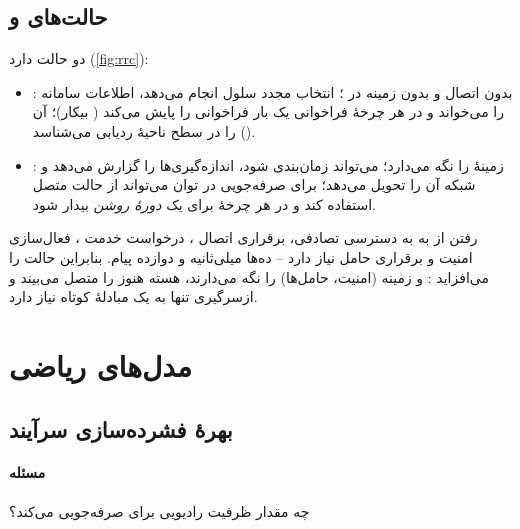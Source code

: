 \documentclass[11pt,a4paper]{article}
\begin{document}
\subsection{حالت‌های  و }
 دو حالت  دارد (\cref{fig:rrc}):
\begin{itemize}
  \item \textbf{}: بدون اتصال  و بدون زمینه در ؛  انتخاب مجدد سلول
        انجام می‌دهد، اطلاعات سامانه را می‌خواند و در هر چرخهٔ فراخوانی یک بار فراخوانی را پایش می‌کند
        ( بیکار)؛  آن را در سطح ناحیهٔ ردیابی می‌شناسد ().
  \item \textbf{}:  زمینهٔ  را نگه می‌دارد؛  می‌تواند زمان‌بندی شود،
        اندازه‌گیری‌ها را گزارش می‌دهد و شبکه آن را تحویل می‌دهد؛ برای صرفه‌جویی در توان می‌تواند از
         حالت متصل استفاده کند و در هر چرخهٔ  برای یک \emph{دورهٔ روشن} بیدار شود.
\end{itemize}
رفتن از  به  به دسترسی تصادفی، برقراری اتصال ، درخواست خدمت ،
فعال‌سازی امنیت و برقراری حامل نیاز دارد -- ده‌ها میلی‌ثانیه و دوازده پیام. بنابراین 
حالت \textbf{} را می‌افزاید \cite{ts38331}:  و  زمینه (امنیت، حامل‌ها) را نگه
می‌دارند، هسته هنوز  را متصل می‌بیند و ازسرگیری تنها به یک مبادلهٔ کوتاه نیاز دارد.

\begin{acnfigure}
  \caption{ماشین حالت .  حالت‌های  و  را دارد؛  حالت
   را می‌افزاید که در آن زمینه به‌جای آزاد شدن معلق می‌شود.}
  \label{fig:rrc}
\end{acnfigure}

\section{مدل‌های ریاضی}

\subsection{بهرهٔ فشرده‌سازی سرآیند}\label{sec:rohc}
\paragraph{مسئله}  چه مقدار ظرفیت رادیویی برای  صرفه‌جویی می‌کند؟
\end{document}
